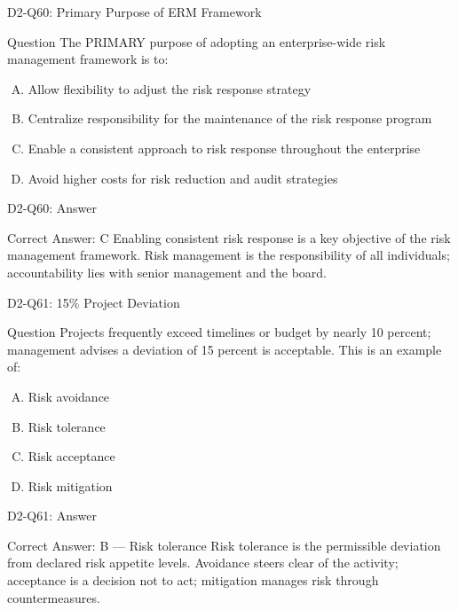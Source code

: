 \documentclass{beamer}
\begin{document}
	\begin{frame}{D2-Q60: Primary Purpose of ERM Framework}
		\begin{block}{Question}
			The PRIMARY purpose of adopting an enterprise-wide risk management framework is to:
		\end{block}
		\begin{enumerate}[(A)]
			\item Allow flexibility to adjust the risk response strategy
			\item Centralize responsibility for the maintenance of the risk response program
			\item Enable a consistent approach to risk response throughout the enterprise
			\item Avoid higher costs for risk reduction and audit strategies
		\end{enumerate}
	\end{frame}
	\begin{frame}{D2-Q60: Answer}
		\begin{block}{Correct Answer: C}
			Enabling consistent risk response is a key objective of the risk management framework. Risk management is the responsibility of all individuals; accountability lies with senior management and the board.
		\end{block}
	\end{frame}
	
	\begin{frame}{D2-Q61: 15\% Project Deviation}
		\begin{block}{Question}
			Projects frequently exceed timelines or budget by nearly 10 percent; management advises a deviation of 15 percent is acceptable. This is an example of:
		\end{block}
		\begin{enumerate}[(A)]
			\item Risk avoidance
			\item Risk tolerance
			\item Risk acceptance
			\item Risk mitigation
		\end{enumerate}
	\end{frame}
	\begin{frame}{D2-Q61: Answer}
		\begin{block}{Correct Answer: B --- Risk tolerance}
			Risk tolerance is the permissible deviation from declared risk appetite levels. Avoidance steers clear of the activity; acceptance is a decision not to act; mitigation manages risk through countermeasures.
		\end{block}
	\end{frame}
	
\end{document}
